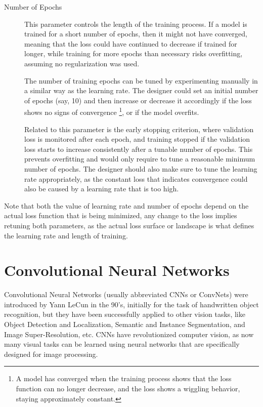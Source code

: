 \begin{description}
    \item[Number of Epochs] This parameter controls the length of the training process. If a model is trained for a short number of epochs, then it might not have converged, meaning that the loss could have continued to decrease if trained for longer, while training for more epochs than necessary risks overfitting, assuming no regularization was used.
    
    The number of training epochs can be tuned by experimenting manually in a similar way as the learning rate. The designer could set an initial number of epochs (say, 10) and then increase or decrease it accordingly if the loss shows no signs of convergence \footnote{A model has converged when the training process shows that the loss function can no longer decrease, and the loss shows a wiggling behavior, staying approximately constant.}, or if the model overfits.
    
    Related to this parameter is the early stopping criterion,  where validation loss is monitored after each epoch, and training stopped if the validation loss starts to increase consistently after a tunable number of epochs. This prevents overfitting and would only require to tune a reasonable minimum number of epochs. The designer should also make sure to tune the learning rate appropriately, as the constant loss that indicates convergence could also be caused by a learning rate that is too high.
\end{description}

Note that both the value of learning rate and number of epochs depend on the actual loss function that is being minimized, any change to the loss implies retuning both parameters, as the actual loss surface or landscape is what defines the learning rate and length of training.

\section{Convolutional Neural Networks}

Convolutional Neural Networks (usually abbreviated CNNs or ConvNets) were introduced by Yann LeCun \cite{lecun1998gradient} in the 90's, initially for the task of handwritten object recognition, but they have been successfully applied to other vision tasks, like Object Detection and Localization, Semantic and Instance Segmentation, and Image Super-Resolution, etc. CNNs have revolutionized computer vision, as now many visual tasks can be learned using neural networks that are specifically designed for image processing.


